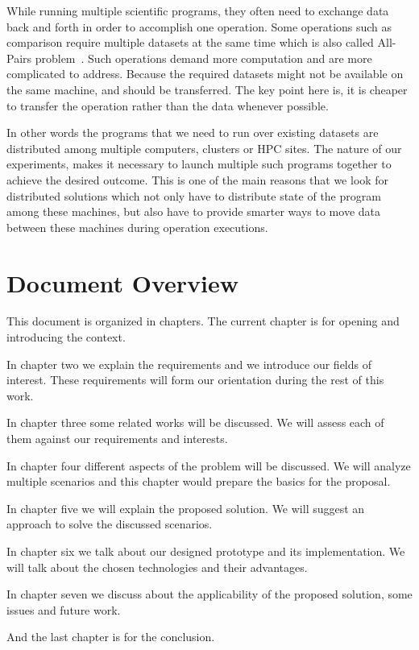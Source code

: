 While running multiple scientific programs, they often need to exchange data back and forth in order to accomplish one operation.
Some operations such as comparison require multiple datasets at the same time which is also called All-Pairs problem~\cite{moretti08}. 
Such operations demand more computation and are more complicated to address. 
Because the required datasets 
might not be available on the same machine, and should be transferred. 
The key point here is, it is cheaper to transfer the operation rather than the data whenever possible. 

In other words the programs that we need to run over existing datasets are distributed among multiple
computers, clusters or HPC sites. The nature of our experiments, makes it necessary to launch
multiple such programs together to achieve the desired outcome. 
This is one of the main reasons that we look
for distributed solutions which not only have to distribute state of the program among these machines,
but also have to provide smarter ways to move data between these machines during operation executions.

\section{Document Overview}
This document is organized in  chapters. 
The current chapter is for opening and introducing the context.

In chapter two we explain the requirements and we introduce our fields of interest. 
These requirements will form our orientation during the rest of this work.

In chapter three some related works will be discussed. 
We will assess each of them against our requirements and interests.

In chapter four different aspects of the problem will be discussed. 
We will analyze multiple scenarios and this chapter would prepare the basics for the proposal.

In chapter five we will explain the proposed solution. 
We will suggest an approach to solve the discussed scenarios.

In chapter six we talk about our designed prototype and its implementation.
We will talk about the chosen technologies and their advantages.

In chapter seven we discuss about the applicability of the proposed solution, some issues and future work.

And the last chapter is for the conclusion.







